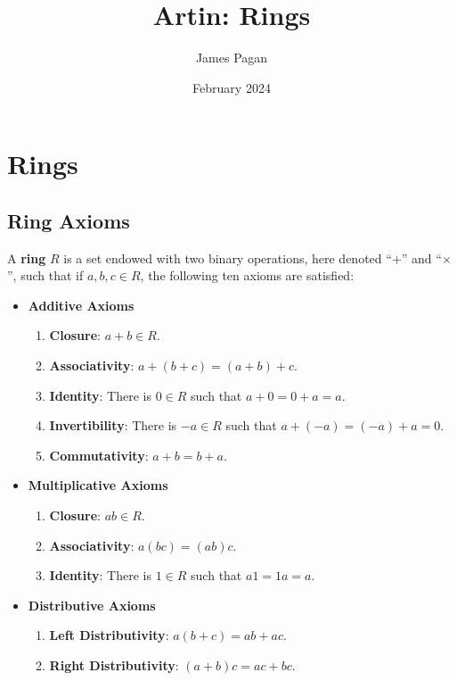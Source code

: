 \documentclass[11pt]{article}
\title{Artin: Rings}
\author{James Pagan}
\date{February 2024}
\begin{document}
\maketitle
\tableofcontents
\newpage


\section{Rings}


\subsection{Ring Axioms}

A \textbf{ring} $R$ is a set endowed with two binary operations, here denoted ``$+$'' and ``$\times$'', such that if $a, b, c \in R$, the following ten axioms are satisfied:

\begin{itemize}
	\item \textbf{Additive Axioms}
	\begin{enumerate}
		\item \textbf{Closure}: $a + b \in R$.
		\item \textbf{Associativity}: $a + (b + c) = (a + b) + c$.
		\item \textbf{Identity}: There is $0 \in R$ such that $a + 0 = 0 + a = a$.
		\item \textbf{Invertibility}: There is $-a \in R$ such that $a + (-a) = (-a) + a = 0$.
		\item \textbf{Commutativity}: $a + b = b + a$.
	\end{enumerate}
	\item \textbf{Multiplicative Axioms}
	\begin{enumerate}\addtocounter{enumi}{5}
		\item \textbf{Closure}: $ab \in R$.
		\item \textbf{Associativity}: $a(bc) = (ab)c$.
		\item \textbf{Identity}: There is $1 \in R$ such that $a1 = 1a = a$.
	\end{enumerate}
	\item \textbf{Distributive Axioms}
	\begin{enumerate}\addtocounter{enumi}{8}
		\item \textbf{Left Distributivity}: $a(b + c) = ab + ac$.
		\item \textbf{Right Distributivity}: $(a + b)c = ac + bc$.
	\end{enumerate}
\end{itemize}
\end{document}
